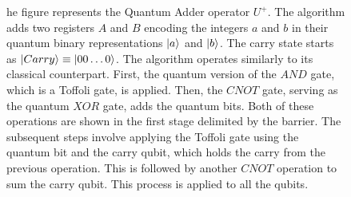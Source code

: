 \documentclass[aps,prapplied,longbibliography]{article}
\begin{document}
    \begin{figure}
        \centering
        \caption{he figure represents the Quantum Adder operator $U^+$. The algorithm adds two registers $A$ and $B$ encoding the integers $a$ and $b$ in their quantum binary representations $\ket{a}$ and $\ket{b}$. The carry state starts as $\ket{Carry}\equiv\ket{00\dots0}$. The algorithm operates similarly to its classical counterpart. First, the quantum version of the $AND$ gate, which is a Toffoli gate, is applied. Then, the $CNOT$ gate, serving as the quantum $XOR$ gate, adds the quantum bits. Both of these operations are shown in the first stage delimited by the barrier. The subsequent steps involve applying the Toffoli gate using the quantum bit and the carry qubit, which holds the carry from the previous operation. This is followed by another $CNOT$ operation to sum the carry qubit. This process is applied to all the qubits.}  
        \label{fig:QuantumAdder}
    \end{figure}
    
\end{document}
